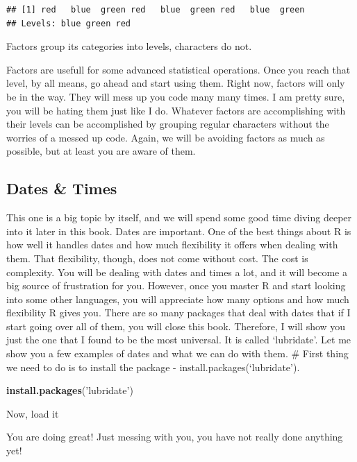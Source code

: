 \documentclass[]{book}
\newenvironment{Shaded}{\begin{snugshade}}{\end{snugshade}}
\newcommand{\KeywordTok}[1]{\textcolor[rgb]{0.13,0.29,0.53}{\textbf{#1}}}
\newcommand{\NormalTok}[1]{#1}
\newcommand{\StringTok}[1]{\textcolor[rgb]{0.31,0.60,0.02}{#1}}
\begin{document}
\begin{verbatim}
## [1] red   blue  green red   blue  green red   blue  green
## Levels: blue green red
\end{verbatim}

Factors group its categories into levels, characters do not.

Factors are usefull for some advanced statistical operations. Once you reach that level, by all means, go ahead and start using them. Right now, factors will only be in the way. They will mess up you code many many times. I am pretty sure, you will be hating them just like I do. Whatever factors are accomplishing with their levels can be accomplished by grouping regular characters without the worries of a messed up code. Again, we will be avoiding factors as much as possible, but at least you are aware of them.

\hypertarget{dates-times}{%
\subsection{Dates \& Times}\label{dates-times}}

This one is a big topic by itself, and we will spend some good time diving deeper into it later in this book. Dates are important. One of the best things about R is how well it handles dates and how much flexibility it offers when dealing with them. That flexibility, though, does not come without cost. The cost is complexity. You will be dealing with dates and times a lot, and it will become a big source of frustration for you. However, once you master R and start looking into some other languages, you will appreciate how many options and how much flexibility R gives you. There are so many packages that deal with dates that if I start going over all of them, you will close this book. Therefore, I will show you just the one that I found to be the most universal. It is called `lubridate'. Let me show you a few examples of dates and what we can do with them. \# First thing we need to do is to install the package - install.packages(`lubridate').

\begin{Shaded}
\begin{Highlighting}[]
\KeywordTok{install.packages}\NormalTok{(}\StringTok{'lubridate'}\NormalTok{)}
\end{Highlighting}
\end{Shaded}

Now, load it

You are doing great! Just messing with you, you have not really done anything yet!
\end{document}
